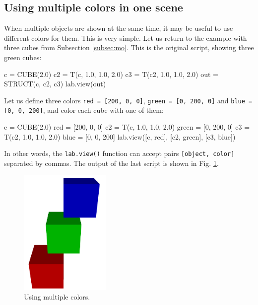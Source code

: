\subsection{Using multiple colors in one scene} \label{subsec:multicolor}

When multiple objects are shown at the same time, it may be useful
to use different colors for them.
This is very simple. Let us return to the example with three cubes 
from Subsection \ref{subsec:mo}. This is the original script,
showing three green cubes:

\begin{bluecode}
c = CUBE(2.0)
c2 = T(c, 1.0, 1.0, 2.0)
c3 = T(c2, 1.0, 1.0, 2.0)
out = STRUCT(c, c2, c3)
lab.view(out)
\end{bluecode}
Let us define three colors {\tt red = [200, 0, 0]}, {\tt green = [0, 200, 0]}
and {\tt blue = [0, 0, 200]}, and color each cube with one of them:

\begin{bluecode}
c = CUBE(2.0)
red = [200, 0, 0]
c2 = T(c, 1.0, 1.0, 2.0)
green = [0, 200, 0]
c3 = T(c2, 1.0, 1.0, 2.0)
blue = [0, 0, 200]
lab.view([c, red], [c2, green], [c3, blue])
\end{bluecode}
\noindent
In other words, the {\tt lab.view()} function can accept pairs {\tt [object, color]} separated
by commas. The output of the last script is shown in Fig. \ref{fig:comp-1k}.

\begin{figure}[!ht]
\begin{center}
\includegraphics[width=0.39\textwidth]{img/multicolor-1.png}
\end{center}
\vspace{-4mm}
\caption{Using multiple colors.}
\label{fig:comp-1k}
\end{figure}



